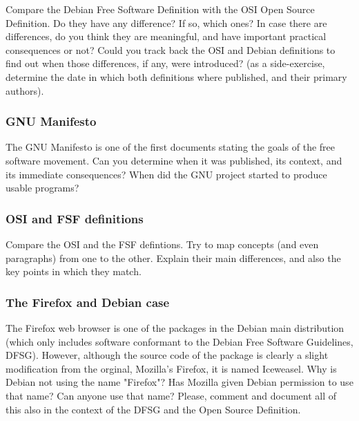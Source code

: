 \documentclass[a4paper]{article}
\begin{document}
Compare the Debian Free Software Definition with the OSI Open Source Definition. Do they have any difference? If so, which ones? In case there are differences, do you think they are meaningful, and have important practical consequences or not? Could you track back the OSI and Debian definitions to find out when those differences, if any, were introduced? (as a side-exercise, determine the date in which both definitions where published, and their primary authors).

\subsubsection{GNU Manifesto}
\label{exe:gnu-manifesto}

The GNU Manifesto is one of the first documents stating the goals of the free software movement. Can you determine when it was published, its context, and its immediate consequences? When did the GNU project started to produce usable programs?

\subsubsection{OSI and FSF definitions}
\label{exe:osi-fsf-definitions}

Compare the OSI and the FSF defintions. Try to map concepts (and even paragraphs) from one to the other. Explain their main differences, and also the key points in which they match.

\subsubsection{The Firefox and Debian case}
\label{exe:firefox-debian-case}

The Firefox web browser is one of the packages in the Debian main distribution (which only includes software conformant to the Debian Free Software Guidelines, DFSG). However, although the source code of the package is clearly a slight modification from the orginal, Mozilla's Firefox, it is named Iceweasel. Why is Debian not using the name "Firefox"? Has Mozilla given Debian permission to use that name? Can anyone use that name? Please, comment and document all of this also in the context of the DFSG and the Open Source Definition.
\end{document}
